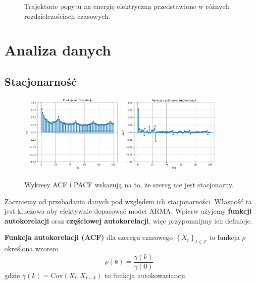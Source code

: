 \documentclass[11pt]{article}
\begin{document}
\begin{figure}[h!]
\begin{minipage}[b]{0.45\textwidth}
    \end{minipage}
	\caption{Trajektorie popytu na energię elektryczną przedstawione w różnych rozdzielczościach czasowych.}
	\label{fig:trajektorie}
\end{figure}


\section{Analiza danych}

\subsection{Stacjonarność}

\begin{figure}[h!]

	\centering
	\includegraphics[width=0.45\textwidth]{acf_niezmodyfikowane.png}
	\hfill
	\includegraphics[width=0.45\textwidth]{pacf_niezmodyfikowane.png}
	\caption{Wykresy ACF i PACF wskazują na to, że szereg nie jest stacjonarny.}
	\label{fig:acf_pacf_niezmodyfikowane}

\end{figure}

Zaczniemy od przebadania danych pod względem ich stacjonarności. Własność ta jest kluczowa aby efektywnie dopasować model ARMA. Wpierw użyjemy \textbf{funkcji autokorelacji} oraz \textbf{częściowej autokorelacji}, więc przypomnijmy ich definicje. \\

\begin{definition}
\textbf{Funkcja autokorelacji (ACF)} dla szeregu czasowego ${\left\lbrace X_t \right\rbrace}_{t \in \mathbb{Z}}$ to funkcja $\rho$ określona wzorem 
$$ \rho(k) = \frac{\gamma\left(k\right)}{\gamma\left(0\right)} $$
gdzie $\gamma(k) = \text{Cov}(X_t, X_{t-k})$ to funkcja autokowariancji.
\end{definition}
\end{document}
